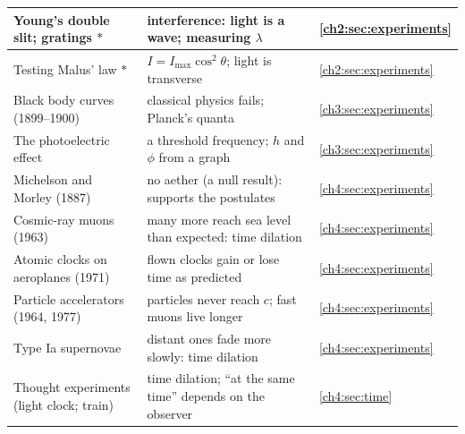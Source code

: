 {\begin{longtable}{@{}L{52mm}@{\hspace{3mm}}L{72mm}@{\hspace{3mm}}L{19mm}@{}}
  Young's double slit; gratings $\ast$ & interference: light is a wave; measuring $\lambda$ &
    \cref{ch2:sec:experiments}\\\hline
  Testing Malus' law $\ast$ & $I = I_\mathrm{max}\cos^2\theta$; light is transverse &
    \cref{ch2:sec:experiments}\\\hline
  Black body curves (1899--1900) & classical physics fails; Planck's quanta &
    \cref{ch3:sec:experiments}\\\hline
  The photoelectric effect & a threshold frequency; $h$ and $\phi$ from a graph &
    \cref{ch3:sec:experiments}\\\hline
  Michelson and Morley (1887) & no aether (a null result): supports the postulates &
    \cref{ch4:sec:experiments}\\\hline
  Cosmic-ray muons (1963) & many more reach sea level than expected: time dilation &
    \cref{ch4:sec:experiments}\\\hline
  Atomic clocks on aeroplanes (1971) & flown clocks gain or lose time as predicted &
    \cref{ch4:sec:experiments}\\\hline
  Particle accelerators (1964, 1977) & particles never reach $c$; fast muons live longer &
    \cref{ch4:sec:experiments}\\\hline
  Type Ia supernovae & distant ones fade more slowly: time dilation &
    \cref{ch4:sec:experiments}\\\hline
  Thought experiments (light clock; train) & time dilation; ``at the same time'' depends on
    the observer & \cref{ch4:sec:time}\\\hline
\end{longtable}}
